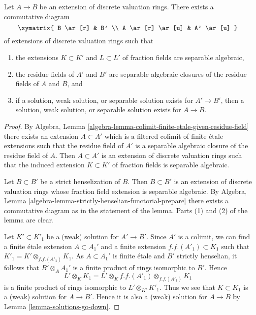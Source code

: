 \begin{lemma}
\label{lemma-solution-after-strict-henselization}
Let $A \to B$ be an extension of discrete valuation rings. There exists
a commutative diagram
$$
\xymatrix{
B \ar[r] & B' \\
A \ar[r] \ar[u] & A' \ar[u]
}
$$
of extensions of discrete valuation rings such that
\begin{enumerate}
\item the extensions $K \subset K'$ and $L \subset L'$ of fraction fields
are separable algebraic,
\item the residue fields of $A'$ and $B'$ are separable algebraic
closures of the residue fields of $A$ and $B$, and
\item if a solution, weak solution, or separable solution exists for
$A' \to B'$, then a solution, weak solution, or separable solution exists
for $A \to B$.
\end{enumerate}
\end{lemma}

\begin{proof}
By Algebra, Lemma \ref{algebra-lemma-colimit-finite-etale-given-residue-field}
there exists an extension $A \subset A'$ which is a filtered colimit of finite
\'etale extensions such that the residue field of $A'$ is a separable algebraic
closure of the residue field of $A$. Then $A \subset A'$ is an extension of
discrete valuation rings such that the induced extension $K \subset K'$ of
fraction fields is separable algebraic.

\medskip\noindent
Let $B \subset B'$ be a strict henselization of $B$. Then $B \subset B'$ is an
extension of discrete valuation rings whose fraction field extension is
separable algebraic. By
Algebra, Lemma \ref{algebra-lemma-strictly-henselian-functorial-prepare}
there exists a commutative diagram as in the statement of the lemma.
Parts (1) and (2) of the lemma are clear.

\medskip\noindent
Let $K' \subset K'_1$ be a (weak) solution for $A' \to B'$. Since $A'$ is a
colimit, we can find a finite \'etale extension $A \subset A_1'$ and a finite
extension $f.f.(A'_1) \subset K_1$ such that
$K'_1 = K' \otimes_{f.f.(A'_1)} K_1$. As $A \subset A_1'$ is finite \'etale
and $B'$ strictly henselian, it follows that $B' \otimes_A A_1'$ is a finite
product of rings isomorphic to $B'$. Hence
$$
L' \otimes_K K_1 = L' \otimes_K f.f.(A'_1) \otimes_{f.f.(A'_1)} K_1
$$
is a finite product of rings isomorphic to $L' \otimes_{K'} K'_1$.
Thus we see that $K \subset K_1$ is a (weak) solution for $A \to B'$.
Hence it is also a (weak) solution for $A \to B$ by
Lemma \ref{lemma-solutions-go-down}.
\end{proof}

